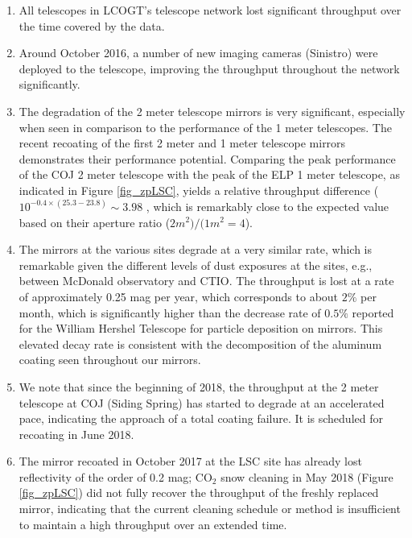 \documentclass[]{spieman}
\begin{document}
\begin{enumerate}
\item All telescopes in LCOGT's telescope network lost significant throughput over the time covered
 by the data. 

\item Around October 2016, a number of new imaging cameras (Sinistro) were deployed to the 
telescope, improving the throughput throughout the network significantly.

\item The degradation of the 2 meter telescope mirrors is very significant, especially when seen in
comparison to the performance of the 1 meter telescopes. The recent recoating of the first 2 meter
and 1 meter telescope mirrors demonstrates their  performance potential. Comparing the peak 
performance of the COJ 2 meter telescope with the peak of the ELP 1 meter telescope, as indicated 
in Figure \ref{fig_zpLSC}, yields a  relative throughput difference  ($10^{-0.4\times (25.3-23.8)} 
\sim 3.98$ , which is remarkably close to the expected value based on their aperture ratio 
($2m^2)/(1m^2 = 4$).

\item The mirrors at the various sites degrade at a very similar rate, which is remarkable given the
different levels of dust exposures at the sites, e.g., between McDonald observatory and CTIO. The
throughput is lost at a rate of approximately 0.25 mag per year, which corresponds to about $2 \%$
per month, which is significantly higher than the decrease rate of $0.5\%$ reported for the William
Hershel Telescope\cite{designolt,benn2000} for particle deposition on mirrors. This elevated decay
rate is  consistent with the decomposition of the aluminum coating seen throughout our mirrors.

\item We note that since the beginning of 2018, the throughput at the 2 meter telescope at COJ 
(Siding Spring) has started to degrade at an accelerated pace, indicating the approach of a total 
coating failure. It is scheduled for recoating in June 2018.

\item The  mirror recoated in October 2017 at the LSC site has already lost reflectivity of the
 order of 0.2 mag; CO$_2$ snow cleaning in May 2018 (Figure \ref{fig_zpLSC}) did not fully recover
 the throughput of the freshly replaced mirror,  indicating that the current cleaning schedule or
 method is insufficient to maintain a high throughput over an extended time.

\end{enumerate}
\end{document}
